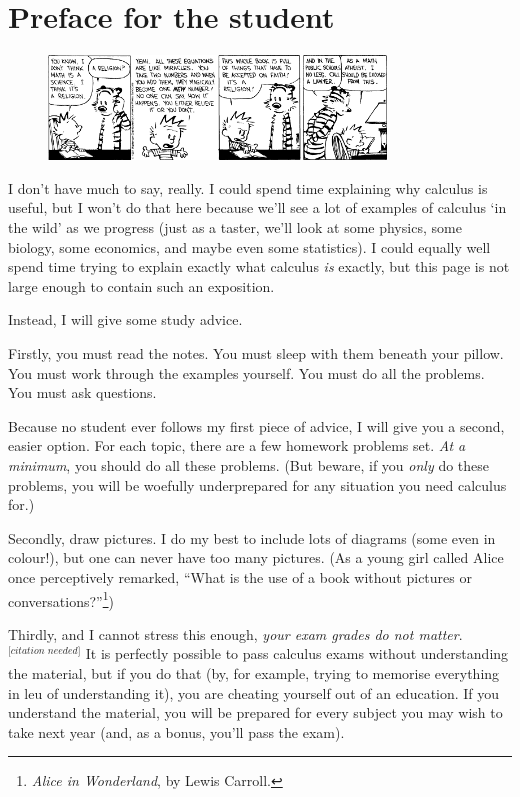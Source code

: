\documentclass[a4paper]{memoir}
\theoremstyle{definition}
\begin{document}
\chapter{Preface for the student}
\begin{figure}
  \centering
  \includegraphics[width=0.8\textwidth]{hobbes}
\end{figure}
I don't have much to say, really. I could spend time explaining why calculus is useful, but I won't do that here because we'll see
a lot of examples of calculus `in the wild' as we progress (just as a taster, we'll look at some physics, some biology, some economics,
and maybe even some statistics). I could equally well spend time trying to explain exactly what calculus \emph{is} exactly, but this
page is not large enough to contain such an exposition.

Instead, I will give some study advice.

Firstly, you must read the notes. You must sleep with them beneath your pillow. You must work through the examples yourself. You must
do all the problems. You must ask questions.

Because no student ever follows my first piece of advice, I will give you a second, easier option. For each topic, there are a few
homework problems set. \emph{At a minimum}, you should do all these problems. (But beware, if you \emph{only} do these problems, you
will be woefully underprepared for any situation you need calculus for.)

Secondly, draw pictures. I do my best to include lots of diagrams (some even in colour!), but one can never have too many
pictures. (As a young girl called Alice once perceptively remarked, ``What is the use of a book without pictures or
conversations?''\footnote{\emph{Alice in Wonderland}, by Lewis Carroll.})

Thirdly, and I cannot stress this enough, \emph{your exam grades do not matter}.$^\textit{[citation needed]}$ It is perfectly possible to pass calculus exams
without understanding the material, but if you do that (by, for example, trying to memorise everything in leu of understanding it),
you are cheating yourself out of an education. If you understand the material, you will be prepared for every subject you may wish
to take next year (and, as a bonus, you'll pass the exam).
\end{document}
